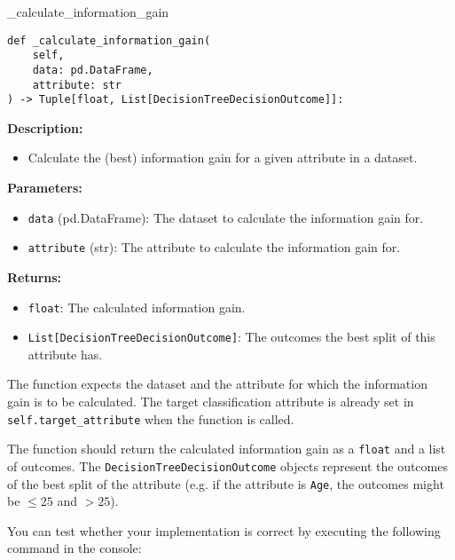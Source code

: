 \documentclass[
english,
smallborders
]{i6prcsht}
\begin{document}
\begin{functionbox}{\_calculate\_information\_gain}
	\begin{lstlisting}[numbers=none]
def _calculate_information_gain(
    self, 
    data: pd.DataFrame, 
    attribute: str
) -> Tuple[float, List[DecisionTreeDecisionOutcome]]:
\end{lstlisting}
	
	\textbf{Description:}
	\begin{itemize}[leftmargin=*,topsep=0pt]
		\item Calculate the (best) information gain for a given attribute in a dataset.
	\end{itemize}
	
	\textbf{Parameters:}
	\begin{itemize}[leftmargin=*,topsep=0pt]
		\item \texttt{data} (pd.DataFrame): The dataset to calculate the information gain for.
		\item \texttt{attribute} (str): The attribute to calculate the information gain for.
	\end{itemize}
	
	\textbf{Returns:}
	\begin{itemize}[leftmargin=*,topsep=0pt]
		\item \texttt{float}: The calculated information gain.
		\item \texttt{List[DecisionTreeDecisionOutcome]}: The outcomes the best split of this attribute has.
	\end{itemize}
\end{functionbox}

\vspace*{0.5cm}

The function expects the dataset and the attribute for which the information gain is to be calculated. The target classification attribute is already set in \texttt{self.target\_attribute} when the function is called.

The function should return the calculated information gain as a \texttt{float} and a list of outcomes. The \texttt{DecisionTreeDecisionOutcome} objects represent the outcomes of the best split of the attribute (e.g. if the attribute is \texttt{Age}, the outcomes might be \texttt{$\leq 25$} and \texttt{$> 25$}).

You can test whether your implementation is correct by executing the following command in the console:

\vspace*{0.3cm}
\end{document}
